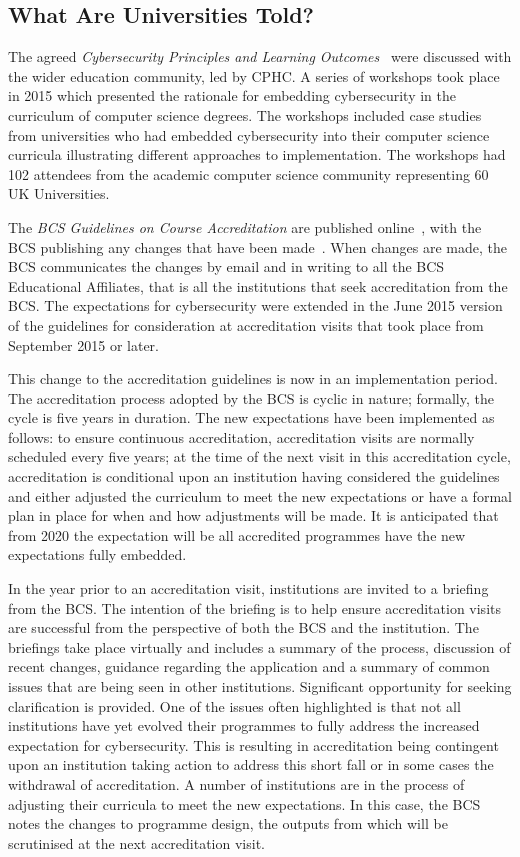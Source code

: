 \documentclass[conference]{IEEEtran}
\begin{document}
{\subsection{What Are Universities Told?}

The agreed {\emph{Cybersecurity Principles and Learning Outcomes}}~\cite{CPHCISC2} were discussed with the wider education community, led by CPHC. A series of workshops took place in 2015 which presented the rationale for embedding cybersecurity in the curriculum of computer science degrees. The workshops included case studies from universities who had embedded cybersecurity into their computer science curricula illustrating different approaches to implementation. The workshops had 102 attendees from the academic computer science community representing 60 UK Universities. 

The {\emph{BCS Guidelines on Course Accreditation}} are published online~\cite{BCS2018a}, with the BCS publishing any changes that have been made~\cite{BCS2018b}. When changes are made, the BCS communicates the changes by email and in writing to all the BCS Educational Affiliates, that is all the institutions that seek accreditation from the BCS. The expectations for cybersecurity were extended in the June 2015 version of the guidelines for consideration at accreditation visits that took place from September 2015 or later.

This change to the accreditation guidelines is now in an implementation period. The accreditation process adopted by the BCS is cyclic in nature; formally, the cycle is five years in duration. The new expectations have been implemented as follows: to ensure continuous accreditation, accreditation visits are normally scheduled every five years; at the time of the next visit in this accreditation cycle, accreditation is conditional upon an institution having considered the guidelines and either adjusted the curriculum to meet the new expectations or have a formal plan in place for when and how adjustments will be made.  It is anticipated that from 2020 the expectation will be all accredited programmes have the new expectations fully embedded.

In the year prior to an accreditation visit, institutions are invited to a briefing from the BCS. The intention of the briefing is to help ensure accreditation visits are successful from the perspective of both the BCS and the institution. The briefings take place virtually and includes a summary of the process, discussion of recent changes, guidance regarding the application and a summary of common issues that are being seen in other institutions. Significant opportunity for seeking clarification is provided. One of the issues often highlighted is that not all institutions have yet evolved their programmes to fully address the increased expectation for cybersecurity. This is resulting in accreditation being contingent upon an institution taking action to address this short fall or in some cases the withdrawal of accreditation. A number of institutions are in the process of adjusting their curricula to meet the new expectations. In this case, the BCS notes the changes to programme design, the outputs from which will be scrutinised at the next accreditation visit.

}
\end{document}
